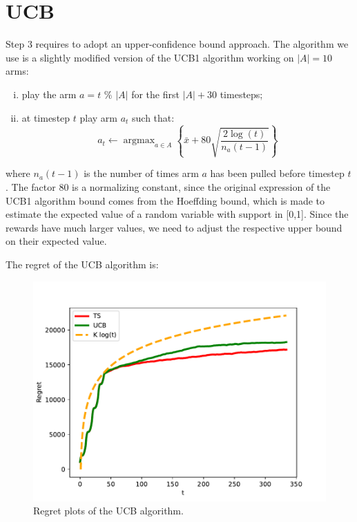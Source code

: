 \documentclass[12pt,a4paper]{report}
\DeclareMathOperator*{\argmax}{argmax}
\begin{document}
		\section{UCB}
Step 3 requires to adopt an upper-confidence bound approach. The algorithm we use is a slightly modified version of the UCB1 algorithm working on $|A|=10$ arms:
\begin{enumerate}[i)]
	\item play the arm $a=t$  $\%$  $|A|$ for the first $|A|+30$ timesteps;
	\item at timestep $t$ play arm $a_t$ such that:
		$$a_t \leftarrow \argmax_{a \in A} \left\{\bar x + 80 \sqrt{\frac{2 \log(t)}{n_a(t-1)}}\right\} $$
\end{enumerate}
where $n_a(t-1)$ is the number of times arm $a$ has been pulled before timestep $t$. The factor 80 is a normalizing constant, since the original expression of the UCB1 algorithm bound comes from the Hoeffding bound, which is made to estimate the expected value of a random variable with support in [0,1]. Since the rewards have much larger values, we need to adjust the respective upper bound on their expected value.

The regret of the UCB algorithm is: 
\begin{figure}[H]
\centering
  \includegraphics[scale = 0.7, center]{3r}
  \caption{Regret plots of the UCB algorithm.}
\end{figure}
\end{document}
